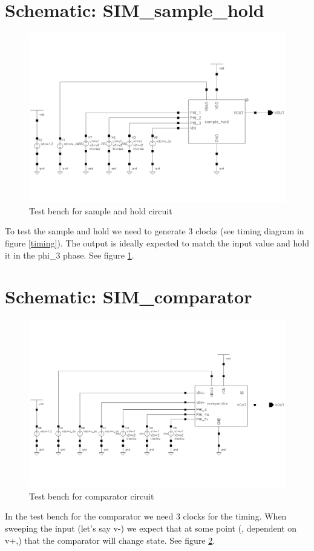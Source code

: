 \documentclass[english, a4paper,11pt]{article}
\begin{document}
\section*{Schematic: SIM\_sample\_hold}
\begin{figure}[!ht]
 \centering
   \includegraphics[width=\textwidth]{img/SIM_sample_hold.png}
   \caption{Test bench for sample and hold circuit}
   \label{sim:sh}
\end{figure}
To test the sample and hold we need to generate 3 clocks (see timing diagram in figure \ref{timing}). 
The output is ideally expected to match the input value and hold it in the phi\_3 phase.
See figure \ref{sim:sh}.

\section*{Schematic: SIM\_comparator}
\begin{figure}[!ht]
 \centering
   \includegraphics[width=\textwidth]{img/SIM_comparator.png}
   \caption{Test bench for comparator circuit}
   \label{sim:comparator}
\end{figure}
In the test bench for the comparator we need 3 clocks for the timing. 
When sweeping the input (let's say v-) we expect that at some point (, dependent on v+,) that the comparator will change state. 
See figure \ref{sim:comparator}.
\end{document}
